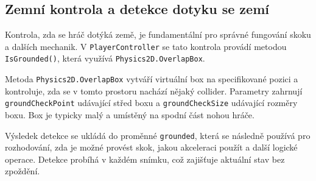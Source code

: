 \subsection{Zemní kontrola a detekce dotyku se zemí}

Kontrola, zda se hráč dotýká země, je fundamentální pro správné fungování skoku a dalších mechanik. V \texttt{PlayerController} se tato kontrola provádí metodou \texttt{IsGrounded()}, která využívá \texttt{Physics2D.OverlapBox}.

Metoda \texttt{Physics2D.OverlapBox} vytváří virtuální box na specifikované pozici a kontroluje, zda se v tomto prostoru nachází nějaký collider. Parametry zahrnují \texttt{groundCheckPoint} udávající střed boxu a \texttt{groundCheckSize} udávající rozměry boxu. Box je typicky malý a umístěný na spodní část nohou hráče.

Výsledek detekce se ukládá do proměnné \texttt{grounded}, která se následně používá pro rozhodování, zda je možné provést skok, jakou akceleraci použít a další logické operace. Detekce probíhá v každém snímku, což zajišťuje aktuální stav bez zpoždění.
